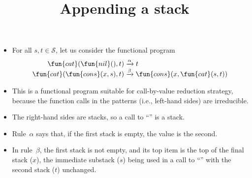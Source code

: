 \documentclass[wide]{slides}
\begin{document}
\begin{slide}
  \title{Appending a stack}

  \begin{itemize}

    \item For all \(s, t \in \mathcal{S}\), let us consider the
      functional program
      \bigskip
      \begin{align*}
        \fun{cat}(\fun{nil}(),t) &\xrightarrow{\alpha} t\\
        \fun{cat}(\fun{cons}(x,s),t) &\xrightarrow{\smash\beta}
        \fun{cons}(x,\fun{cat}(s,t))
      \end{align*}
      \smallskip

    \item This is a functional program suitable for
      call\hyp{}by\hyp{}value reduction strategy, because the function
      calls in the patterns (i.e., left\hyp{}hand sides) are
      irreducible.

    \item The right\hyp{}hand sides are stacks, so a call to
      ``'' is a stack.

    \item Rule~\(\alpha\) says that, if the first stack is empty, the
      value is the second.

    \item In rule~\(\beta\), the first stack is not empty, and its top
      item is the top of the final stack (\(x\)), the immediate
      substack (\(s\)) being used in a call to ``'' with the
      second stack (\(t\)) unchanged.

  \end{itemize}

\end{slide}
\end{document}

